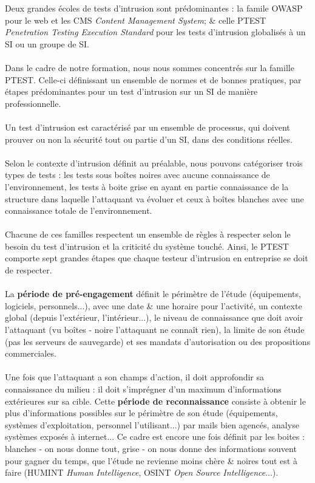 Deux grandes écoles de tests d'intrusion sont prédominantes : la famile OWASP pour le web et les CMS \textit{Content Management System}; \& celle PTEST \textit{Penetration Testing Execution Standard} pour les tests d'intrusion globalisés à un SI ou un groupe de SI.
\\ \\
Dans le cadre de notre formation, nous nous sommes concentrés sur la famille PTEST. Celle-ci définissant un ensemble de normes et de bonnes pratiques, par étapes prédominantes pour un test d'intrusion sur un SI de manière professionnelle.
\\ \\
Un test d'intrusion est caractérisé par un ensemble de processus, qui doivent prouver ou non la sécurité tout ou partie d'un SI, dans des conditions réelles.
\\ \\
Selon le contexte d'intrusion définit au préalable, nous pouvons catégoriser trois types de tests : les tests sous boîtes noires avec aucune connaissance de l'environnement, les tests à boite grise en ayant en partie connaissance de la structure dans laquelle l'attaquant va évoluer et ceux à boîtes blanches avec une connaissance totale de l'environnement.
\\ \\
Chacune de ces familles respectent un ensemble de règles à respecter selon le besoin du test d'intrusion et la criticité du système touché. Ainsi, le PTEST comporte sept grandes étapes que chaque testeur d'intrusion en entreprise se doit de respecter.
\\ \\
La \textbf{période de pré-engagement} définit le périmètre de l'étude (équipements, logiciels, personnels...), avec une date \& une horaire pour l'activité, un contexte global (depuis l'extérieur, l'intérieur...), le niveau de connaissance que doit avoir l'attaquant (vu boîtes - noire l'attaquant ne connaît rien), la limite de son étude (pas les serveurs de sauvegarde) et ses mandats d'autorisation ou des propositions commerciales.
\\ \\
Une fois que l'attaquant a son champs d'action, il doit approfondir sa connaissance du milieu : il doit s'imprégner d'un maximum d'informations extérieures sur sa cible. Cette \textbf{période de reconnaissance} consiste à obtenir le plus d'informations possibles sur le périmètre de son étude (équipements, systèmes d'exploitation, personnel l'utilisant...) par mails bien agencés, analyse systèmes exposés à internet... Ce cadre est encore une fois définit par les boites : blanches - on nous donne tout, grise - on nous donne des informations souvent pour gagner du temps, que l'étude ne revienne moins chère \& noires tout est à faire (HUMINT \textit{Human Intelligence}, OSINT \textit{Open Source Intelligence}...).
